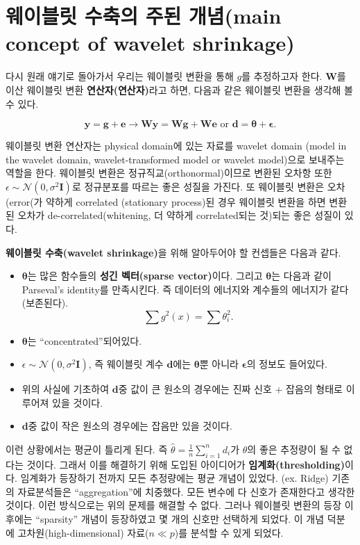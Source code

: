 \documentclass[b5paper,]{scrbook}
\theoremstyle{plain}
\theoremstyle{definition}
\numberwithin{equation}{section}
\begin{document}
\section{웨이블릿 수축의 주된 개념(main concept of wavelet
shrinkage)}\label{---main-concept-of-wavelet-shrinkage}

다시 원래 얘기로 돌아가서 우리는 웨이블릿 변환을 통해 \(g\)를 추정하고자
한다. \(\mathbf{W}\)를 이산 웨이블릿 변환 \textbf{연산자(연산자)}라고
하면, 다음과 같은 웨이블릿 변환을 생각해 볼 수 있다.

\[\mathbf{y}=\mathbf{g}+\mathbf{e} \rightarrow \mathbf{Wy} =\mathbf{Wg}+\mathbf{We} \text{ or } \mathbf{d}=\boldsymbol{\theta}+\boldsymbol{\epsilon}.\]

웨이블릿 변환 연산자는 physical domain에 있는 자료를 wavelet domain
(model in the wavelet domain, wavelet-transformed model or wavelet
model)으로 보내주는 역할을 한다. 웨이블릿 변환은
정규직교(orthonormal)이므로 변환된 오차항 또한
\(\epsilon \sim \mathcal{N}(0,\sigma^{2}\mathbf{I})\)로 정규분포를
따르는 좋은 성질을 가진다. 또 웨이블릿 변환은 오차(error(가 약하게
correlated (stationary process)된 경우 웨이블릿 변환을 하면 변환된
오차가 de-correlated(whitening, 더 약하게 correlated되는 것)되는 좋은
성질이 있다.

\textbf{웨이블릿 수축(wavelet shrinkage)}을 위해 알아두어야 할 컨셉들은
다음과 같다.

\begin{itemize}
\item
  \(\boldsymbol{\theta}\)는 많은 함수들의 \textbf{성긴 벡터(sparse
  vector)}이다. 그리고 \(\boldsymbol{\theta}\)는 다음과 같이 Parseval's
  identity를 만족시킨다. 즉 데이터의 에너지와 계수들의 에너지가
  같다(보존된다). \[\sum g^{2}(x)=\sum \theta_{i}^{2}.\]
\item
  \(\boldsymbol{\theta}\)는 ``concentrated''되어있다.
\item
  \(\epsilon \sim \mathcal{N}(0,\sigma^{2}\mathbf{I})\), 즉 웨이블릿
  계수 \(\mathbf{d}\)에는 \(\boldsymbol{\theta}\)뿐 아니라
  \(\mathbf{\epsilon}\)의 정보도 들어있다.
\item
  위의 사실에 기초하여 \(\mathbf{d}\)중 값이 큰 원소의 경우에는 진짜
  신호 + 잡음의 형태로 이루어져 있을 것이다.
\item
  \(\mathbf{d}\)중 값이 작은 원소의 경우에는 잡음만 있을 것이다.
\end{itemize}

이런 상황에서는 평균이 틀리게 된다. 즉
\(\hat{\theta}=\frac{1}{n}\sum_{i=1}^{n}d_{i}\)가 \(\theta\)의 좋은
추정량이 될 수 없다는 것이다. 그래서 이를 해결하기 위해 도입된
아이디어가 \textbf{임계화(thresholding)}이다. 임계화가 등장하기 전까지
모든 추정량에는 평균 개념이 있었다. (ex. Ridge) 기존의 자료분석들은
``aggregation''에 치중했다. 모든 변수에 다 신호가 존재한다고 생각한
것이다. 이런 방식으로는 위의 문제를 해결할 수 없다. 그러나 웨이블릿
변환의 등장 이후에는 ``sparsity'' 개념이 등장하였고 몇 개의 신호만
선택하게 되었다. 이 개념 덕분 에 고차원(high-dimensional)
자료(\(n \ll p\))를 분석할 수 있게 되었다.
\end{document}
